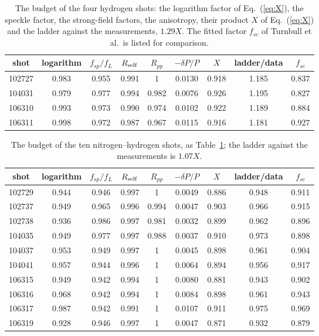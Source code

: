 \documentclass[11pt]{article}
\numberwithin{equation}{section}
\begin{document}
\begin{table}[ht]
\caption{The budget of the four hydrogen shots: the logarithm factor of Eq.~(\ref*{eq:X}), the speckle
factor, the strong-field factors, the anisotropy, their product $X$ of Eq.~(\ref*{eq:X}) and the ladder against
the measurements, $1.29X$. The fitted factor $f_{sc}$ of Turnbull et al.\ is listed for comparison.}
\label{tab:budget}
\begin{center}
\begin{tabular}{ccccccccc}
\toprule
shot & logarithm & $f_{sp}/f_L$ & $R_{\rm self}$ & $R_{pp}$ & $-\delta P/P$ & $X$ & ladder/data & $f_{sc}$\\
\midrule
102727 & 0.983 & 0.955 & 0.991 & 1 & 0.0130 & 0.918 & 1.185 & 0.837\\
104031 & 0.979 & 0.977 & 0.994 & 0.982 & 0.0076 & 0.926 & 1.195 & 0.827\\
106310 & 0.993 & 0.973 & 0.990 & 0.974 & 0.0102 & 0.922 & 1.189 & 0.884\\
106311 & 0.998 & 0.972 & 0.987 & 0.967 & 0.0115 & 0.916 & 1.181 & 0.927\\
\bottomrule
\end{tabular}
\end{center}
\end{table}

\begin{table}[ht]
\caption{The budget of the ten nitrogen--hydrogen shots, as Table~\ref*{tab:budget}; the ladder
against the measurements is $1.07X$.}
\label{tab:mixbudget}
\begin{center}
\begin{tabular}{ccccccccc}
\toprule
shot & logarithm & $f_{sp}/f_L$ & $R_{\rm self}$ & $R_{pp}$ & $-\delta P/P$ & $X$ & ladder/data & $f_{sc}$\\
\midrule
102729 & 0.944 & 0.946 & 0.997 & 1 & 0.0049 & 0.886 & 0.948 & 0.911\\
102737 & 0.949 & 0.965 & 0.996 & 0.994 & 0.0047 & 0.903 & 0.966 & 0.915\\
102738 & 0.936 & 0.986 & 0.997 & 0.981 & 0.0032 & 0.899 & 0.962 & 0.896\\
104035 & 0.949 & 0.977 & 0.997 & 0.988 & 0.0037 & 0.910 & 0.973 & 0.898\\
104037 & 0.953 & 0.949 & 0.997 & 1 & 0.0045 & 0.898 & 0.961 & 0.904\\
104041 & 0.957 & 0.944 & 0.996 & 1 & 0.0064 & 0.894 & 0.956 & 0.917\\
106315 & 0.949 & 0.942 & 0.994 & 1 & 0.0080 & 0.881 & 0.943 & 0.902\\
106316 & 0.968 & 0.942 & 0.994 & 1 & 0.0084 & 0.898 & 0.961 & 0.943\\
106317 & 0.987 & 0.942 & 0.991 & 1 & 0.0107 & 0.911 & 0.975 & 0.969\\
106319 & 0.928 & 0.946 & 0.997 & 1 & 0.0047 & 0.871 & 0.932 & 0.879\\
\bottomrule
\end{tabular}
\end{center}
\end{table}
\end{document}
